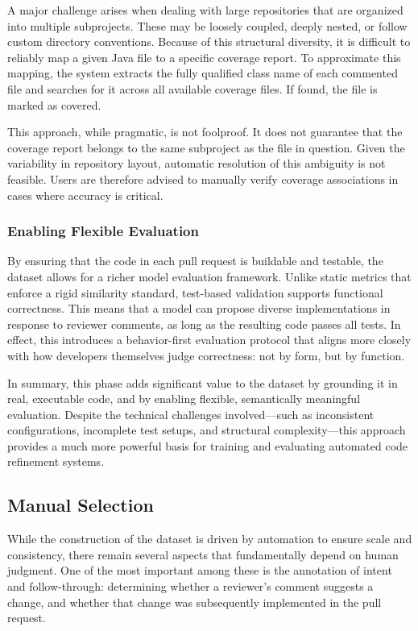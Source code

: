 A major challenge arises when dealing with large repositories that are organized into multiple
subprojects. These may be loosely coupled, deeply nested, or follow custom directory conventions.
Because of this structural diversity, it is difficult to reliably map a given Java file to a
specific coverage report. To approximate this mapping, the system extracts the fully qualified class
name of each commented file and searches for it across all available coverage files. If found, the
file is marked as covered.

This approach, while pragmatic, is not foolproof. It does not guarantee that the coverage report
belongs to the same subproject as the file in question. Given the variability in repository layout,
automatic resolution of this ambiguity is not feasible. Users are therefore advised to manually
verify coverage associations in cases where accuracy is critical.

\subsubsection{Enabling Flexible Evaluation}

By ensuring that the code in each pull request is buildable and testable, the dataset allows for a
richer model evaluation framework. Unlike static metrics that enforce a rigid similarity standard,
test-based validation supports functional correctness. This means that a model can propose diverse
implementations in response to reviewer comments, as long as the resulting code passes all tests. In
effect, this introduces a behavior-first evaluation protocol that aligns more closely with how
developers themselves judge correctness: not by form, but by function.

In summary, this phase adds significant value to the dataset by grounding it in real, executable
code, and by enabling flexible, semantically meaningful evaluation. Despite the technical challenges
involved—such as inconsistent configurations, incomplete test setups, and structural complexity—this
approach provides a much more powerful basis for training and evaluating automated code refinement
systems.

\subsection{Manual Selection}
\label{sec:manual-selection}

While the construction of the dataset is driven by automation to ensure scale and consistency, there
remain several aspects that fundamentally depend on human judgment. One of the most important among
these is the annotation of intent and follow-through: determining whether a reviewer’s comment
suggests a change, and whether that change was subsequently implemented in the pull request.

